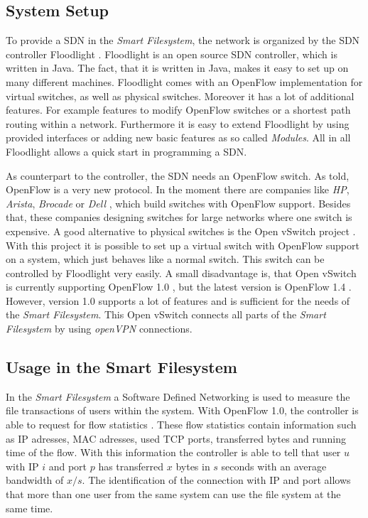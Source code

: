 \subsection{System Setup}
To provide a SDN in the \textit{Smart Filesystem}, the network is organized by the SDN controller Floodlight \cite{flood}. Floodlight is an open source SDN controller, which is written in Java. The fact, that it is written in Java, makes it easy to set up on many different machines. Floodlight comes with an OpenFlow implementation for virtual switches, as well as physical switches. Moreover it has a lot of additional features. For example features to modify OpenFlow switches or a shortest path routing within a network. Furthermore it is easy to extend Floodlight by using provided interfaces or adding new basic features as so called \textit{Modules}. All in all Floodlight allows a quick start in programming a SDN.

As counterpart to the controller, the SDN needs an OpenFlow switch. As told, OpenFlow is a very new protocol. In the moment there are companies like \textit{HP}, \textit{Arista}, \textit{Brocade} or \textit{Dell} , which build switches with OpenFlow support. Besides that, these companies designing switches for large networks where one switch is expensive. A good alternative to physical switches is the Open vSwitch project \cite{ovs2}. With this project it is possible to set up a virtual switch with OpenFlow support on a system, which just behaves like a normal switch. This switch can be controlled by Floodlight very easily. A small disadvantage is, that Open vSwitch is currently supporting OpenFlow 1.0 \cite{ovs}, but the latest version is OpenFlow 1.4 \cite{ofspec4}. However, version 1.0 supports a lot of features and is sufficient for the needs of the \textit{Smart Filesystem}.
This Open vSwitch connects all parts of the \textit{Smart Filesystem} by using \textit{openVPN} connections.     
   
\subsection{Usage in the Smart Filesystem}\label{usage}
In the \textit{Smart Filesystem} a Software Defined Networking is used to measure the file transactions of users within the system. With OpenFlow 1.0, the controller is able to request for flow statistics \cite[P.\,31]{ofspec}. These flow statistics contain information such as IP adresses, MAC adresses, used TCP ports, transferred bytes and running time of the flow. With this information the controller is able to tell that user $u$ with IP $i$ and port $p$ has transferred $x$ bytes in $s$ seconds with an average bandwidth of $x/s$. The identification of the connection with IP and port allows that more than one user from the same system can use the file system at the same time.

